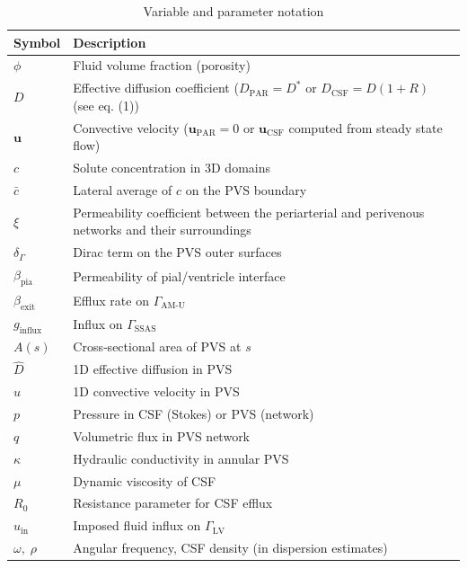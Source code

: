 \documentclass[fleqn,10pt]{wlscirep}
\begin{document}
\begin{table}[htb!]
\centering 
\caption{Variable and parameter notation}
\label{table:variable}
\begin{tabular}{ll}
\hline
\textbf{Symbol} & \textbf{Description} \\
\hline
$\phi$ & Fluid volume fraction (porosity) \\
$D$ & Effective diffusion coefficient ($D_{\mathrm{PAR}} = D^*$ or $D_{\mathrm{CSF}} = D(1+R)$ (see eq. (1)) \\
$\mathbf{u}$ & Convective velocity ($\mathbf{u}_{\mathrm{PAR}} = 0$ or $\mathbf{u}_{\mathrm{CSF}}$ computed from steady state flow) \\
$c$ & Solute concentration in 3D domains \\
$\bar c$ & Lateral average of $c$ on the PVS boundary \\
$\xi$ & Permeability coefficient between the periarterial and perivenous networks
and their surroundings\\
$\delta_{\Gamma}$ & Dirac term on the PVS outer surfaces \\
$\beta_{\mathrm{pia}}$ & Permeability of pial/ventricle interface \\
$\beta_{\mathrm{exit}}$ & Efflux rate on $\Gamma_{\mathrm{AM\text{-}U}}$ \\
$g_{\mathrm{influx}}$ & Influx on $\Gamma_{\mathrm{SSAS}}$ \\
$A(s)$ & Cross‐sectional area of PVS at $s$ \\
$\hat D$ & 1D effective diffusion in PVS \\
$\hat u$ & 1D convective velocity in PVS \\
$p$ & Pressure in CSF (Stokes) or PVS (network) \\
$q$ & Volumetric flux in PVS network \\
$\kappa$ & Hydraulic conductivity in annular PVS \\
$\mu$ & Dynamic viscosity of CSF \\
$R_{0}$ & Resistance parameter for CSF efflux \\
$u_{\mathrm{in}}$ & Imposed fluid influx on $\Gamma_{\mathrm{LV}}$ \\
$\omega,\;\rho$ & Angular frequency, CSF density (in dispersion estimates) \\
\hline
\end{tabular}
\end{table}
\end{document}
